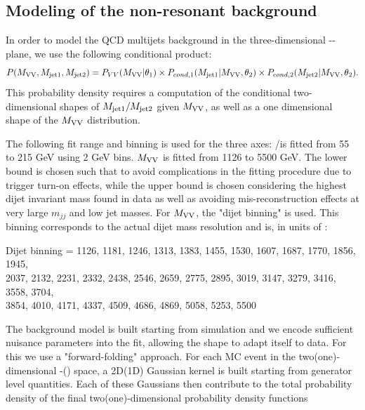 \subsection{Modeling of the non-resonant background}
\label{sec:nonresbkgd}

In order to model the QCD multijets background in the three-dimensional \MVV-\MJO-\MJT plane, we use the following conditional product:
\begin{equation}
	\small
	P(M_{\rm VV},M_{\rm jet1},M_{\rm jet2}) = P_{VV}(M_{\rm VV}|\theta_1) \times P_{cond,1}(M_{\rm jet1}|M_{\rm VV},\theta_2) \times P_{cond,2}(M_{\rm jet2}|M_{\rm VV},\theta_2).
\end{equation} 
This probability density requires a computation of the conditional two-dimensional shapes of $M_{\rm jet1}/M_{\rm jet2}$ given $M_{\rm VV}$, as well as a one dimensional shape of the $M_{\rm VV}$ distribution.

The following fit range and binning is used for the three axes: \MJO/\MJT is fitted from 55 to 215 GeV using 2 GeV bins. $M_{\rm VV}$ is fitted from 1126 to 5500 GeV. The lower bound is chosen such that to avoid complications in the fitting procedure due to trigger turn-on effects, while the upper bound is chosen considering the highest dijet invariant mass found in data as well as avoiding mis-reconstruction effects at very large $m_{jj}$ and low jet masses. For $M_{\rm VV}$, the "dijet binning" is used. This binning corresponds to the actual dijet mass resolution and is, in units of \GeV:\newline


Dijet binning = 1126, 1181, 1246, 1313, 1383, 1455, 1530, 1607, 1687, 1770, 1856, 1945, \\
2037, 2132, 2231, 2332, 2438, 2546, 2659, 2775, 2895, 3019, 3147, 3279, 3416, 3558, 3704, \\
3854, 4010, 4171, 4337, 4509, 4686, 4869, 5058, 5253, 5500\newline


The background model is built starting from simulation and we encode sufficient nuisance parameters into the fit, allowing the shape
to adapt itself to data. For this we use a "forward-folding" approach. For each MC event in the two(one)-dimensional \MVV-\MJ(\MJ) space, a 2D(1D) Gaussian kernel is built starting from generator level quantities. Each of these Gaussians then contribute to the total probability density of the final two(one)-dimensional probability density functions

